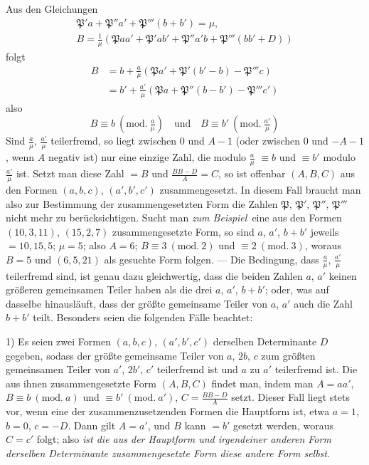 Aus den Gleichungen
\[
\begin{gathered}\mathfrak{P}'a+\mathfrak{P}''a'+\mathfrak{P}'''(b+b')=\mu,\\
B=\frac{1}{\mu}(\mathfrak{P}aa'+\mathfrak{P}'ab'+\mathfrak{P}''a'b+\mathfrak{P}'''(bb'+D))\end{gathered}
\]
folgt
\[
\begin{aligned}B&=b+\frac{a}{\mu}(\mathfrak{P}a'+\mathfrak{P}'(b'-b)-\mathfrak{P}'''c)\\&=b'+\frac{a'}{\mu}(\mathfrak{P}a+\mathfrak{P}''(b-b')-\mathfrak{P}'''c')\end{aligned}
\]
also
\[
B\equiv b\ (\mathrm{mod.}\ \tfrac{a}{\mu})\quad\text{und}\quad B\equiv b'\ (\mathrm{mod.}\ \tfrac{a'}{\mu})
\]
Sind $\frac{a}{\mu}$, $\frac{a'}{\mu}$ teilerfremd, so liegt zwischen $0$ und $A-1$ (oder zwischen $0$ und $-A-1$, wenn $A$ negativ ist) nur eine einzige Zahl, die modulo $\frac{a}{\mu}$ $\equiv b$ und $\equiv b'$ modulo $\frac{a'}{\mu}$ ist. Setzt man diese Zahl $=B$ und $\frac{BB-D}{A}=C$, so ist offenbar $(A,B,C)$ aus den Formen $(a,b,c)$, $(a',b',c')$ zusammengesetzt. In diesem Fall braucht man also zur Bestimmung der zusammengesetzten Form die Zahlen $\mathfrak{P}$, $\mathfrak{P}'$, $\mathfrak{P}''$, $\mathfrak{P}'''$ nicht mehr zu berücksichtigen. Sucht man \textit{zum Beispiel}\ eine aus den Formen $(10,3,11)$, $(15,2,7)$ zusammengesetzte Form, so sind $a$, $a'$, $b+b'$ jeweils $=10,15,5$; $\mu=5$; also $A=6$; $B\equiv3\ (\mathrm{mod.}\ 2)$ und $\equiv2\ (\mathrm{mod.}\ 3)$, woraus $B=5$ und $(6,5,21)$ als gesuchte Form folgen. --- Die Bedingung, dass $\frac{a}{\mu}$, $\frac{a'}{\mu}$ teilerfremd sind, ist genau dazu gleichwertig, dass die beiden Zahlen $a$, $a'$ keinen größeren gemeinsamen Teiler haben als die drei $a$, $a'$, $b+b'$; oder, was auf dasselbe hinausläuft, dass der größte gemeinsame Teiler von $a$, $a'$ auch die Zahl $b+b'$ teilt. Besonders seien die folgenden Fälle beachtet:

1) Es seien zwei Formen $(a,b,c)$, $(a',b',c')$ derselben Determinante $D$ gegeben, sodass der größte gemeinsame Teiler von $a$, $2b$, $c$ zum größten gemeinsamen Teiler von $a'$, $2b'$, $c'$ teilerfremd ist und $a$ zu $a'$ teilerfremd ist. Die aus ihnen zusammengesetzte Form $(A,B,C)$ findet man, indem man $A=aa'$, $B\equiv b\ (\mathrm{mod.}\ a)$ und $\equiv b'\ (\mathrm{mod.}\ a')$, $C=\frac{BB-D}{A}$ setzt. Dieser Fall liegt stets vor, wenn eine der zusammenzusetzenden Formen die Hauptform ist, etwa $a=1$, $b=0$, $c=-D$. Dann gilt $A=a'$, und $B$ kann
$=b'$ gesetzt werden, woraus $C=c'$ folgt; also \textit{ist die aus der Hauptform und irgendeiner anderen Form derselben Determinante zusammengesetzte Form diese andere Form selbst.}

